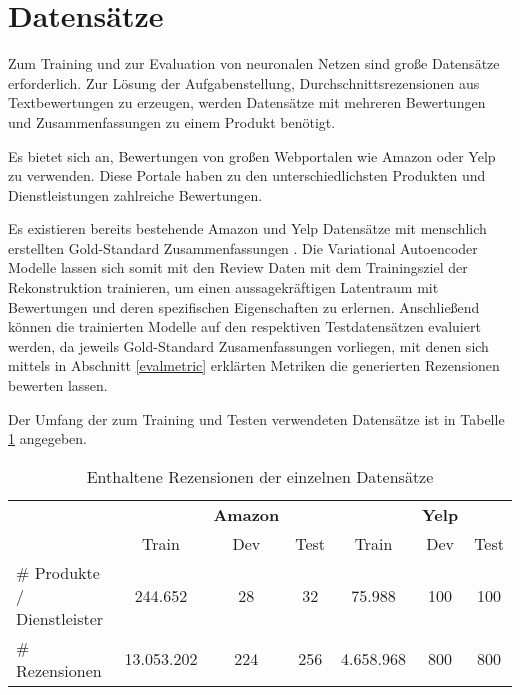 \section{Datensätze}\raggedbottom
\label{dataset}
Zum Training und zur Evaluation von neuronalen Netzen sind große Datensätze erforderlich. 
Zur Lösung der Aufgabenstellung, Durchschnittsrezensionen aus Textbewertungen zu erzeugen, werden Datensätze mit mehreren Bewertungen und Zusammenfassungen zu einem Produkt benötigt.

Es bietet sich an, Bewertungen von großen Webportalen wie Amazon oder Yelp zu verwenden. 
Diese Portale haben zu den unterschiedlichsten Produkten und Dienstleistungen zahlreiche Bewertungen.

Es existieren bereits bestehende Amazon und Yelp Datensätze mit menschlich erstellten Gold-Standard Zusammenfassungen \citep{copycat}. 
Die Variational Autoencoder Modelle lassen sich somit mit den Review Daten mit dem Trainingsziel der Rekonstruktion trainieren, um einen aussagekräftigen Latentraum mit Bewertungen und deren spezifischen Eigenschaften zu erlernen.
Anschließend können die trainierten Modelle auf den respektiven Testdatensätzen evaluiert werden, da jeweils Gold-Standard Zusamenfassungen vorliegen, mit denen sich mittels in Abschnitt \ref{evalmetric} erklärten Metriken die generierten Rezensionen bewerten lassen.

Der Umfang der zum Training und Testen verwendeten Datensätze ist in Tabelle \ref{dataset_table} angegeben.

\begin{table}[!h]
    \centering
    \begin{tabular}{@{}lcccccc@{}}
        \toprule
                              &            & \textbf{Amazon} &      &           & \textbf{Yelp} &      \\
                              & Train      & Dev             & Test & Train     & Dev           & Test \\ \midrule
    \# Produkte / Dienstleister & 244.652    &   28            &  32  & 75.988    &  100          &  100    \\
    \# Rezensionen            & 13.053.202 &    224          &   256& 4.658.968 &  800          &  800 \\ \bottomrule
    \end{tabular}
    \caption{Enthaltene Rezensionen der einzelnen Datensätze \citep{coop}}
    \label{dataset_table}
    \end{table}

